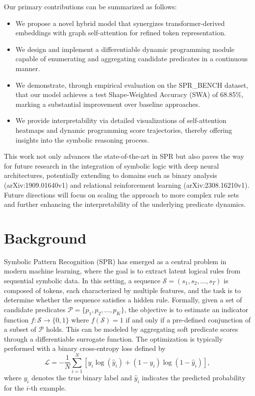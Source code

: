 \documentclass{article}
\begin{document}
Our primary contributions can be summarized as follows:
\begin{itemize}
    \item We propose a novel hybrid model that synergizes transformer-derived embeddings with graph self-attention for refined token representation.
    \item We design and implement a differentiable dynamic programming module capable of enumerating and aggregating candidate predicates in a continuous manner.
    \item We demonstrate, through empirical evaluation on the SPR\_BENCH dataset, that our model achieves a test Shape-Weighted Accuracy (SWA) of 68.85\%, marking a substantial improvement over baseline approaches.
    \item We provide interpretability via detailed visualizations of self-attention heatmaps and dynamic programming score trajectories, thereby offering insights into the symbolic reasoning process.
\end{itemize}
This work not only advances the state-of-the-art in SPR but also paves the way for future research in the integration of symbolic logic with deep neural architectures, potentially extending to domains such as binary analysis (arXiv:1909.01640v1) and relational reinforcement learning (arXiv:2308.16210v1). Future directions will focus on scaling the approach to more complex rule sets and further enhancing the interpretability of the underlying predicate dynamics.

\section{Background}
Symbolic Pattern Recognition (SPR) has emerged as a central problem in modern machine learning, where the goal is to extract latent logical rules from sequential symbolic data. In this setting, a sequence \( \mathcal{S} = (s_1, s_2, \ldots, s_T) \) is composed of tokens, each characterized by multiple features, and the task is to determine whether the sequence satisfies a hidden rule. Formally, given a set of candidate predicates \(\mathcal{P} = \{p_1, p_2, \ldots, p_K\}\), the objective is to estimate an indicator function \( f : \mathcal{S} \to \{0,1\} \) where \( f(\mathcal{S}) = 1 \) if and only if a pre-defined conjunction of a subset of \(\mathcal{P}\) holds. This can be modeled by aggregating soft predicate scores through a differentiable surrogate function. The optimization is typically performed with a binary cross-entropy loss defined by
\[
\mathcal{L} = -\frac{1}{N}\sum_{i=1}^{N} \left[y_i \log(\hat{y}_i) + (1-y_i)\log(1-\hat{y}_i)\right],
\]
where \( y_i \) denotes the true binary label and \( \hat{y}_i \) indicates the predicted probability for the \(i\)-th example.
\end{document}
